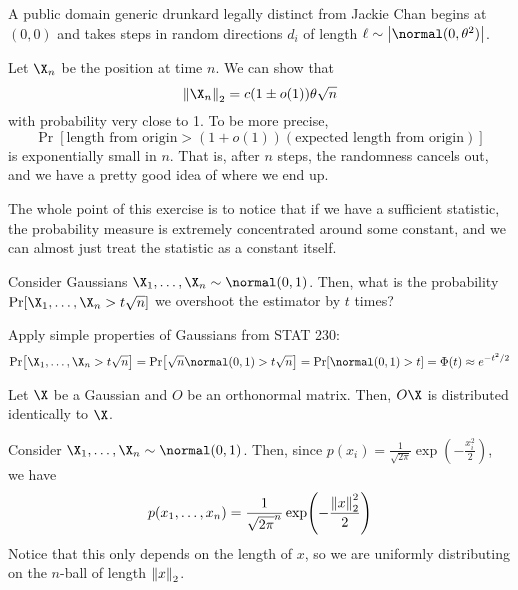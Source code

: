 \documentclass[class=co432,notes,tikz]{agony}
\begin{document}
\begin{example}
  A public domain generic drunkard legally distinct from Jackie Chan begins at $(0,0)$
  and takes steps in random directions $d_i$
  of length $\ell \sim \abs{\normal(0,\theta^2)}$.
\end{example}

Let $\X_n$ be the position at time $n$.
We can show that 
\[ \norm{\X_n}_2 = c(1\pm o(1))\theta\sqrt{n} \]
with probability very close to 1. To be more precise,
\[ \Pr[\text{length from origin} > (1+o(1))(\text{expected length from origin})] \]
is exponentially small in $n$.
That is, after $n$ steps, the randomness cancels out,
and we have a pretty good idea of where we end up.

The whole point of this exercise is to notice that if we have a sufficient statistic,
the probability measure is extremely concentrated around some constant,
and we can almost just treat the statistic as a constant itself.

\begin{example}
  Consider \iid Gaussians $\X_1,\dotsc,\X_n \sim \normal(0,1)$.
  Then, what is the probability $\Pr[\X_1,\dotsc,\X_n > t\sqrt{n}]$
  we overshoot the estimator by $t$ times?
\end{example}
\begin{sol}
  Apply simple properties of Gaussians from STAT 230:
  \begin{align*}
    \Pr[\X_1,\dotsc,\X_n > t\sqrt{n}] = \Pr[\sqrt n\normal(0,1) > t\sqrt{n}] = \Pr[\normal(0,1) > t] = \Phi(t) \approx e^{-t^2/2}
  \end{align*}
\end{sol}

\begin{lemma}
  Let $\X$ be a Gaussian and $O$ be an orthonormal matrix.
  Then, $O\X$ is distributed identically to $\X$.
\end{lemma}
\begin{prf}
  Consider \iid $\X_1,\dotsc,\X_n \sim \normal(0,1)$.
  Then, since $p(x_i) = \frac1{\sqrt{2\pi}}\exp(-\frac{x_i^2}{2})$, we have
  \[ p(x_1,\dotsc,x_n) = \frac{1}{\sqrt{2\pi}^n}\exp(-\frac{\norm{x}_2^2}{2}) \]
  Notice that this only depends on the length of $x$,
  so we are uniformly distributing on the $n$-ball of length $\norm{x}_2$.
\end{prf}
\end{document}
